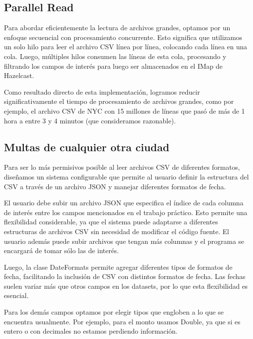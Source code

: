 \documentclass[a4paper,12pt]{article}
\begin{document}
	\subsection{Parallel Read}
	
	Para abordar eficientemente la lectura de archivos grandes, optamos por un enfoque secuencial con procesamiento concurrente. Esto significa que utilizamos un solo hilo para leer el archivo CSV línea por línea, colocando cada línea en una cola. Luego, múltiples hilos consumen las líneas de esta cola, procesando y filtrando los campos de interés para luego ser almacenados en el IMap de Hazelcast.
	
	\bigskip
	
	Como resultado directo de esta implementación, logramos reducir significativamente el tiempo de procesamiento de archivos grandes, como por ejemplo, el archivo CSV de NYC con 15 millones de líneas que pasó de más de 1 hora a entre 3 y 4 minutos (que consideramos razonable).
	
	\subsection{Multas de cualquier otra ciudad}
	
	Para ser lo más permisivos posible al leer archivos CSV de diferentes formatos, diseñamos un sistema configurable que permite al usuario definir la estructura del CSV a través de un archivo JSON y manejar diferentes formatos de fecha.
	
	\bigskip
	
	El usuario debe subir un archivo JSON que especifica el índice de cada columna de interés entre los campos mencionados en el trabajo práctico. Esto permite una flexibilidad considerable, ya que el sistema puede adaptarse a diferentes estructuras de archivos CSV sin necesidad de modificar el código fuente. El usuario además puede subir archivos que tengan más columnas y el programa se encargará de tomar sólo las de interés.
	
	\bigskip
	
	Luego, la clase DateFormats permite agregar diferentes tipos de formatos de fecha, facilitando la inclusión de CSV con distintos formatos de fecha. Las fechas suelen variar más que otros campos en los datasets, por lo que esta flexibilidad es esencial.
	
	\bigskip
	
	Para los demás campos optamos por elegir tipos que engloben a lo que se encuentra usualmente. Por ejemplo, para el monto usamos Double, ya que si es entero o con decimales no estamos perdiendo información.
	
\end{document}
